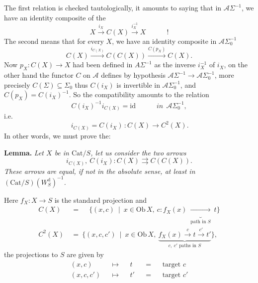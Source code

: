 \documentclass[11pt]{article}
\newcommand{\printedpage}[1]{\marginpar{\footnotesize p.~#1}}
\newcommand{\msp}[1]{\marginpar{\footnotesize [#1]}}
\newcommand{\Cat}{\mathrm{Cat}}
\newcommand{\Ob}{\mathrm{Ob}}
\newcommand{\id}{\mathrm{id}}
\newcommand{\cA}{\mathcal{A}}
\begin{document}
\msp{page 68}
The first relation is checked tautologically, it amounts to saying that in $\cA\Sigma^{-1}$, we have an identity composite of the
\[
X\xrightarrow{i_X}C(X)\xrightarrow{i_X^{-1}}X\qquad\quad!
\]
The second means that for every $X$, we have an identity composite in $\cA\Sigma_0^{-1}$
\[
C(X)\xrightarrow{i_{C(X)}}C(C(X))\xrightarrow{C(p_X)}C(X).
\]
Now $p_X:C(X)\longrightarrow X$ had been defined in $A\Sigma^{-1}$ as the inverse $i_X^{-1}$ of $i_X$, on the other hand the functor $C$ on $\cA$ defines by hypothesis $\cA\Sigma^{-1}\longrightarrow\cA\Sigma_0^{-1}$, more precisely $C(\Sigma)\subseteq\Sigma_0$ %
\printedpage{42}
thus $C(i_X)$ is invertible in $\cA\Sigma_0^{-1}$, and $C(p_X)=C(i_X)^{-1}$. So the compatibility amounts to the relation
\[
C(i_X)^{-1}i_{C(X)}=\id\qquad\quad\textit{in}\ \ \cA\Sigma_0^{-1},
\]
i.e.
\[
\boxed{\,i_{C(X)}=C(i_X)\,}:C(X)\longrightarrow C^2(X).
\]
In other words, we must prove the: %

\textbf{Lemma.} \textit{Let $X$ be in $\Cat/S$, let us consider the two arrows}
\[
i_{C(X)},\ C(i_X):C(X)\rightrightarrows C(C(X)).
\]
\textit{These arrows are equal, if not in the absolute sense, at least in $(\Cat/S)(W_S^{\mathrm{d}})^{-1}$.}

Here $f_X:X\longrightarrow S$ is the standard projection and
\[
\begin{aligned}
C(X)\ &=\ \quad\{(x,c)\ \mid\ x\in\Ob\,X,\ c:f_X(x)\ \underbrace{\longrightarrow}_{\text{path in }S}\ t\}\\
C^2(X)\ &=\ \{(x,c,c')\ \mid\ x\in\Ob\,X,\ \underbrace{f_X(x)\xrightarrow{c}t\xrightarrow{c'}t'}_{c,\ c'\text{ paths in }S}\},
\end{aligned}
\]
the projections to $S$ are given by
\[
\begin{aligned}
(x,c)&&\longmapsto&&t&&=&&\text{target }c\\
(x,c,c')&&\longmapsto&&t'&&=&&\text{target }c'
\end{aligned}
\]
\end{document}
